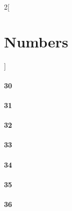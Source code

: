 \documentclass{book}
\begin{document}
\begin{multicols}{2}[\part{Numbers}]
\subsection*{30}
\subsection*{31}
\subsection*{32}
\subsection*{33}
\subsection*{34}
\subsection*{35}
\subsection*{36}
\end{multicols}
\end{document}
